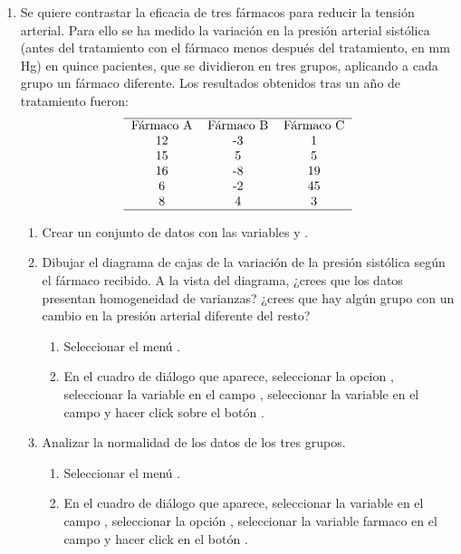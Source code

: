\begin{enumerate}[leftmargin=*]
\item Se quiere contrastar la eficacia de tres fármacos para reducir la tensión arterial. Para ello se ha medido la
variación en la presión arterial sistólica (antes del tratamiento con el fármaco menos después del tratamiento, en mm
Hg) en quince pacientes, que se dividieron en tres grupos, aplicando a cada grupo un fármaco diferente. Los resultados
obtenidos tras un año de tratamiento fueron:
\[
\begin{tabular}{ccc}
\hline 
Fármaco A & Fármaco B & Fármaco C\\
12 & -3 & 1 \\
15 &  5 & 5 \\
16 & -8 & 19 \\
 6 & -2 & 45 \\
 8 &  4 &  3 \\
\hline
\end{tabular}
\]
\begin{enumerate}
\item Crear un conjunto de datos con las variables  y .

\item Dibujar el diagrama de cajas de la variación de la presión sistólica según el fármaco recibido.
A la vista del diagrama, ¿crees que los datos presentan homogeneidad de varianzas? 
¿crees que hay algún grupo con un cambio en la presión arterial diferente del resto?
\begin{indicacion}{
\begin{enumerate}
\item Seleccionar el menú .
\item En el cuadro de diálogo que aparece, seleccionar la opcion , seleccionar la variable
 en el campo , seleccionar la variable  en el campo
 y hacer click sobre el botón .
\end{enumerate}
}
\end{indicacion}

\item Analizar la normalidad de los datos de los tres grupos. 
\begin{indicacion}{
\begin{enumerate}
\item Seleccionar el menú .
\item En el cuadro de diálogo que aparece, seleccionar la variable  en el campo ,
seleccionar la opción , seleccionar la variable {farmaco} en el campo  y
hacer click en el botón .
\end{enumerate}}
\end{indicacion}


\end{enumerate}
\end{enumerate}
